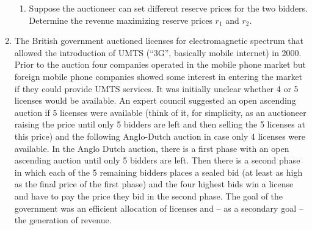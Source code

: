 \documentclass[a4paper,12pt]{article}
\begin{document}
\begin{enumerate}[resume]
\begin{enumerate}
  \item Suppose the auctioneer can set different reserve prices for the two bidders. Determine the revenue maximizing reserve prices $r_1$ and $r_2$.
  \end{enumerate}
  \item The British government auctioned licenses for electromagnetic spectrum that allowed the introduction of UMTS (``3G'', basically mobile internet) in 2000. Prior to the auction four companies operated in the mobile phone market but foreign mobile phone companies showed some interest in entering the market if they could provide UMTS services. It was initially unclear whether 4 or 5 licenses would be available. An expert council suggested an open ascending auction if 5 licenses were available (think of it, for simplicity, as an auctioneer raising the price until only 5 bidders are left and then selling the 5 licenses at this price) and the following Anglo-Dutch auction in case only 4 licenses were available. In the Anglo Dutch auction, there is a first phase with an open ascending auction until only 5 bidders are left. Then there is a second phase in which each of the 5 remaining bidders places a sealed bid (at least as high as the final price of the first phase) and the four highest bids win a license and have to pay the price they bid in the second phase. The goal of the government was an efficient allocation of licenses and -- as a secondary goal -- the generation of revenue.\\

\end{enumerate}
\end{document}
